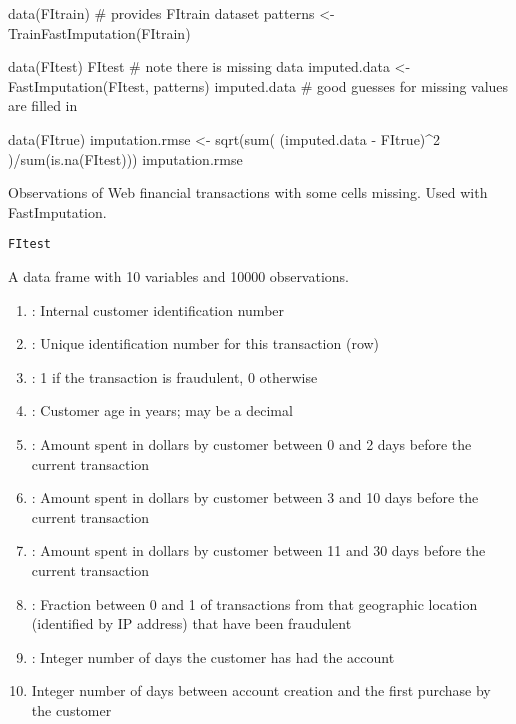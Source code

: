 \documentclass[a4paper]{book}
\begin{document}
%
\begin{Examples}
\begin{ExampleCode}
data(FItrain)   # provides FItrain dataset
patterns <- TrainFastImputation(FItrain)

data(FItest)
FItest          # note there is missing data
imputed.data <- FastImputation(FItest, patterns)
imputed.data    # good guesses for missing values are filled in

data(FItrue)
imputation.rmse <- sqrt(sum( (imputed.data - FItrue)^2 )/sum(is.na(FItest)))
imputation.rmse
\end{ExampleCode}
\end{Examples}
%
\begin{Description}\relax
Observations of Web financial transactions with some 
cells missing. Used with FastImputation.
\end{Description}
%
\begin{Usage}
\begin{verbatim}
FItest
\end{verbatim}
\end{Usage}
%
\begin{Format}
 A data frame with 10 variables and 10000 observations. \begin{enumerate}

\item {}: Internal customer identification number
\item {}: Unique identification number for this transaction (row)
\item {}: 1 if the transaction is fraudulent, 0 otherwise
\item {}: Customer age in years; may be a decimal
\item {}: Amount spent in dollars by customer between 0 and 2 days before the current transaction
\item {}: Amount spent in dollars by customer between 3 and 10 days before the current transaction
\item {}: Amount spent in dollars by customer between 11 and 30 days before the current transaction
\item {}: Fraction between 0 and 1 of transactions from that geographic location (identified by IP address) that have been fraudulent
\item {}: Integer number of days the customer has had the account
\item {} Integer number of days between account creation and the first purchase by the customer

\end{enumerate}
\end{Format}
\end{document}
